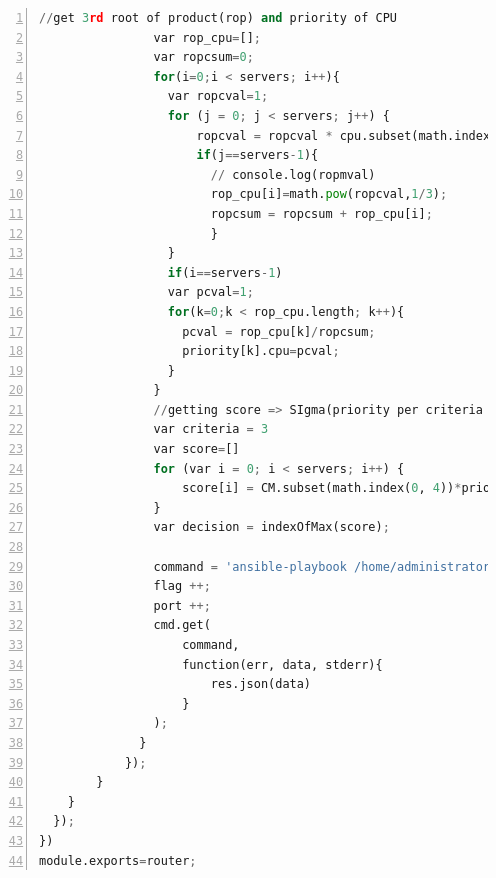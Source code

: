 \begin{lstlisting}[numbers=left, frame=single,tabsize=2,breaklines,caption={Kode sumber Model Auth},label=modelAuth, language=python]
                //get 3rd root of product(rop) and priority of CPU
                var rop_cpu=[];
                var ropcsum=0;
                for(i=0;i < servers; i++){
                  var ropcval=1;
                  for (j = 0; j < servers; j++) {
                      ropcval = ropcval * cpu.subset(math.index(i, j))
                      if(j==servers-1){
                        // console.log(ropmval)
                        rop_cpu[i]=math.pow(ropcval,1/3);
                        ropcsum = ropcsum + rop_cpu[i];
                        }   
                  }
                  if(i==servers-1)
                  var pcval=1;
                  for(k=0;k < rop_cpu.length; k++){
                    pcval = rop_cpu[k]/ropcsum;
                    priority[k].cpu=pcval;
                  }
                }
                //getting score => SIgma(priority per criteria * weifgth of node for each criteria) 
                var criteria = 3
                var score=[]               
                for (var i = 0; i < servers; i++) {
                    score[i] = CM.subset(math.index(0, 4))*priority[i].cpu + CM.subset(math.index(1, 4))*priority[i].memory + CM.subset(math.index(2, 4))*priority[i].df             
                }
                var decision = indexOfMax(score);

                command = 'ansible-playbook /home/administrator/TA-Daniel/ansible-test/playbooks/apache.yml --extra-vars "port='+port+' host='+resources[decision].hostname+' name=container'+flag+'"';
                flag ++;
                port ++;
                cmd.get(
                    command,
                    function(err, data, stderr){
                        res.json(data)
                    }
                );
              }
            });
        }
    }
  });
})
module.exports=router;
\end{lstlisting}

\backmatter %
